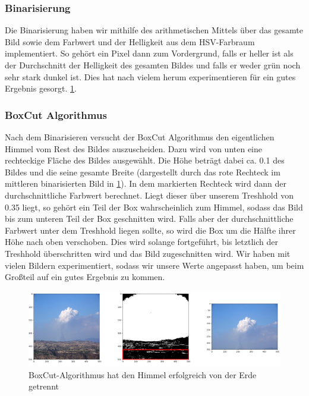\documentclass[a4,german]{article}
\begin{document}
\subsubsection{Binarisierung} 
\label{sec:binary}
Die Binarisierung haben wir mithilfe des arithmetischen Mittels über das gesamte Bild sowie dem Farbwert und der Helligkeit aus dem HSV-Farbraum implementiert.
So gehört  ein Pixel dann zum Vordergrund, falls er heller ist als der Durchschnitt der Helligkeit des gesamten Bildes und falls er weder grün noch sehr stark dunkel ist.
Dies hat nach vielem herum experimentieren für ein gutes Ergebnis gesorgt. \ref{fig:boxAlg}.

\subsubsection{BoxCut Algorithmus}
\label{sec:boxcut}
Nach dem Binarisieren versucht der BoxCut Algorithmus den eigentlichen Himmel vom Rest des Bildes auszuscheiden. Dazu wird von unten eine rechteckige Fläche des Bildes ausgewählt. Die Höhe beträgt dabei ca. 0.1 %
des Bildes und die seine gesamte Breite (dargestellt durch das rote Rechteck im mittleren binarisierten Bild in \ref{fig:boxAlg}). In dem markierten Rechteck wird dann der durchschnittliche Farbwert berechnet.
Liegt dieser über unserem Treshhold %
von 0.35 liegt, so gehört ein Teil der Box wahrscheinlich zum Himmel, sodass das Bild bis zum unteren Teil der Box geschnitten wird.
Falls aber der durchschnittliche Farbwert unter dem Treshhold liegen sollte, so wird die Box um die Hälfte ihrer Höhe nach oben verschoben. Dies wird solange fortgeführt, bis letztlich der Treshhold überschritten wird und das Bild zugeschnitten wird.
Wir haben mit vielen Bildern experimentiert, sodass wir unsere Werte angepasst haben, um beim Großteil auf ein gutes Ergebnis zu kommen.


\begin{figure}[h!]
\centering
\includegraphics[width=1.1\textwidth]{boxAlg} %
\caption{BoxCut-Algorithmus hat den Himmel erfolgreich von der Erde getrennt}
\label{fig:boxAlg}
\end{figure}
\end{document}
